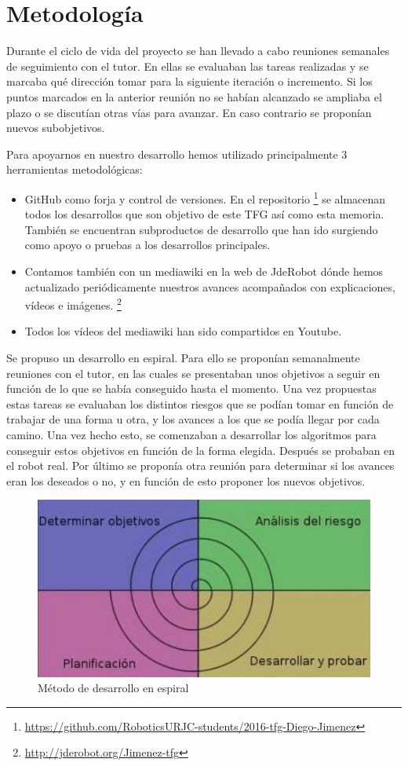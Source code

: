 \section{Metodología}

Durante el ciclo de vida del proyecto se han llevado a cabo reuniones semanales de seguimiento con el tutor. En ellas se evaluaban las tareas realizadas y se marcaba qué dirección tomar para la siguiente iteración o incremento. Si los puntos marcados en la anterior reunión no se habían alcanzado se ampliaba el plazo o se discutían otras vías para avanzar. En caso contrario se proponían nuevos subobjetivos.

Para apoyarnos en nuestro desarrollo hemos utilizado principalmente 3 herramientas metodológicas:
\begin{itemize}
\item GitHub como forja y control de versiones. En el repositorio \footnote{\url{https://github.com/RoboticsURJC-students/2016-tfg-Diego-Jimenez}}
se almacenan todos los desarrollos que son objetivo de este TFG así como esta memoria. También se encuentran subproductos de desarrollo que han ido surgiendo como apoyo o pruebas a los desarrollos principales.
\item Contamos también con un mediawiki en la web de JdeRobot dónde hemos actualizado periódicamente nuestros avances acompañados con explicaciones, vídeos e imágenes. \footnote{\url{http://jderobot.org/Jimenez-tfg}}
\item Todos los vídeos del mediawiki han sido compartidos en Youtube.
\end{itemize}

Se propuso un desarrollo en espiral. Para ello se proponían semanalmente reuniones con el tutor, en las cuales se presentaban unos objetivos a seguir en función de lo que se había conseguido hasta el momento. Una vez propuestas estas tareas se evaluaban los distintos riesgos que se podían tomar en función de trabajar de una forma u otra, y los avances a los que se podía llegar por cada camino. Una vez hecho esto, se comenzaban a desarrollar los algoritmos para conseguir estos objetivos en función de la forma elegida. Después se probaban en el robot real. Por último se proponía otra reunión para determinar si los avances eran los deseados o no, y en función de esto proponer los nuevos objetivos.


\begin{figure}[H]
	\centering
		\includegraphics{imagenes/metodologia-espiral.jpg}
        \caption{Método de desarrollo en espiral}
	\label{fig:Desarrollo en espiral}
\end{figure}


